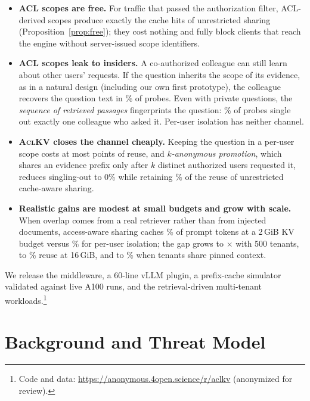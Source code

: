 \documentclass[11pt]{article}
\newcommand{\sysname}{\textsc{AclKV}\xspace}
\begin{document}
\begin{itemize}
\item \textbf{ACL scopes are free.} For traffic that passed the authorization filter, ACL-derived scopes produce exactly the cache hits of unrestricted sharing (Proposition~\ref{prop:free}); they cost nothing and fully block clients that reach the engine without server-issued scope identifiers.
\item \textbf{ACL scopes leak to insiders.} A co-authorized colleague can still learn about other users' requests. If the question inherits the scope of its evidence, as in a natural design (including our own first prototype), the colleague recovers the question text in \numqueryRevealedVone\% of probes. Even with private questions, the \emph{sequence of retrieved passages} fingerprints the question: \numsingledACLScope\% of probes single out exactly one colleague who asked it. Per-user isolation has neither channel.
\item \textbf{\sysname closes the channel cheaply.} Keeping the question in a per-user scope costs at most \numprivTailCostExact{} points of reuse, and \emph{$k$-anonymous promotion}, which shares an evidence prefix only after $k$ distinct authorized users requested it, reduces singling-out to 0\% while retaining \numaclkvRetainHQ\% of the reuse of unrestricted cache-aware sharing.
\item \textbf{Realistic gains are modest at small budgets and grow with scale.} When overlap comes from a real retriever rather than from injected documents, access-aware sharing caches \numhqACLKV\% of prompt tokens at a 2\,GiB KV budget versus \numhqPerUser\% for per-user isolation; the gap grows to \numusersRatioFiveHundred$\times$ with 500 tenants, to \numkvSixteenACLScopeTree\% reuse at 16\,GiB, and to \numpinACLKV\% when tenants share pinned context.
\end{itemize}

\noindent We release the middleware, a 60-line vLLM plugin, a prefix-cache simulator validated against \numfidN{} live A100 runs, and the retrieval-driven multi-tenant workloads.\footnote{Code and data: \url{https://anonymous.4open.science/r/aclkv} (anonymized for review).}

\section{Background and Threat Model}
\label{sec:background}
\end{document}
